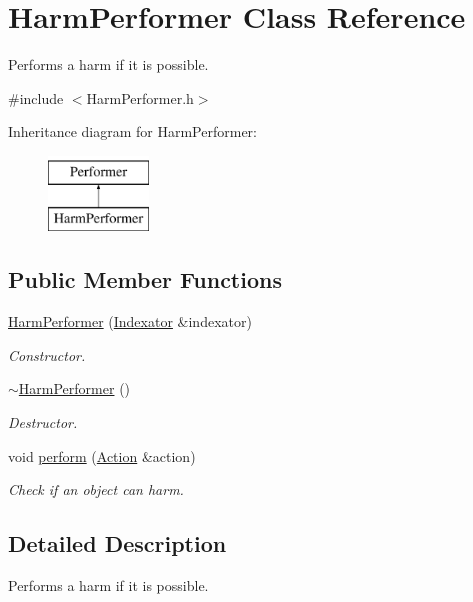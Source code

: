\hypertarget{classHarmPerformer}{\section{Harm\-Performer Class Reference}
\label{classHarmPerformer}
}


Performs a harm if it is possible.  




{\ttfamily \#include $<$Harm\-Performer.\-h$>$}

Inheritance diagram for Harm\-Performer\-:\begin{figure}[H]
\begin{center}
\leavevmode
\includegraphics[height=2.000000cm]{classHarmPerformer}
\end{center}
\end{figure}
\subsection*{Public Member Functions}
\begin{DoxyCompactItemize}
\item 
\hyperlink{classHarmPerformer_a4df21e699f3cfc7501398221da29d11a}{Harm\-Performer} (\hyperlink{classIndexator}{Indexator} \&indexator)
\begin{DoxyCompactList}\small\item\em Constructor. \end{DoxyCompactList}\item 
\hyperlink{classHarmPerformer_a0c1d9f1e442a5926c2f8b1b7b294c9aa}{$\sim$\-Harm\-Performer} ()
\begin{DoxyCompactList}\small\item\em Destructor. \end{DoxyCompactList}\item 
void \hyperlink{classHarmPerformer_a58a611a6b7cd808b9e57fb6b5123701c}{perform} (\hyperlink{classAction}{Action} \&action)
\begin{DoxyCompactList}\small\item\em Check if an object can harm. \end{DoxyCompactList}\end{DoxyCompactItemize}


\subsection{Detailed Description}
Performs a harm if it is possible. 

